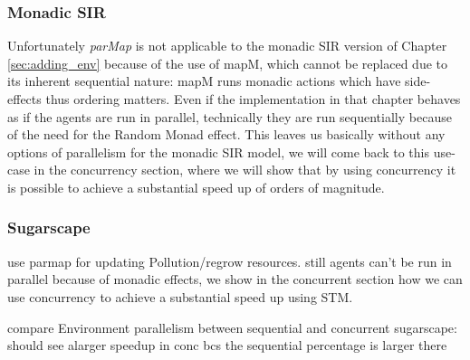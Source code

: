 \subsubsection{Monadic SIR}
Unfortunately \textit{parMap} is not applicable to the monadic SIR version of Chapter \ref{sec:adding_env} because of the use of mapM, which cannot be replaced due to its inherent sequential nature: mapM runs monadic actions which have side-effects thus ordering matters. Even if the implementation in that chapter behaves as if the agents are run in parallel, technically they are run sequentially because of the need for the Random Monad effect. This leaves us basically without any options of parallelism for the monadic SIR model, we will come back to this use-case in the concurrency section, where we will show that by using concurrency it is possible to achieve a substantial speed up of orders of magnitude.

\subsubsection{Sugarscape}
use parmap for updating Pollution/regrow resources. still agents can't be run in parallel because of monadic effects, we show in the concurrent section how we can use concurrency to achieve a substantial speed up using STM.

compare Environment parallelism between sequential and concurrent sugarscape: should see alarger speedup in conc bcs the sequential percentage is larger there



